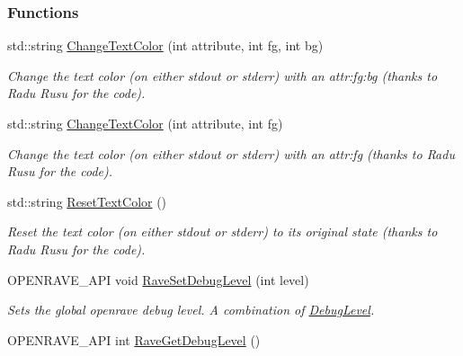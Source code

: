 \subsubsection*{Functions}
\begin{DoxyCompactItemize}
\item 
\hypertarget{namespaceOpenRAVE_a985876f10adcdcd967c0293b7ec17022}{
std::string \hyperlink{namespaceOpenRAVE_a985876f10adcdcd967c0293b7ec17022}{ChangeTextColor} (int attribute, int fg, int bg)}
\label{namespaceOpenRAVE_a985876f10adcdcd967c0293b7ec17022}

\begin{DoxyCompactList}\small\item\em Change the text color (on either stdout or stderr) with an attr:fg:bg (thanks to Radu Rusu for the code). \item\end{DoxyCompactList}\item 
\hypertarget{namespaceOpenRAVE_ab58a943ef75af625e8f87e6d2f6f7b3c}{
std::string \hyperlink{namespaceOpenRAVE_ab58a943ef75af625e8f87e6d2f6f7b3c}{ChangeTextColor} (int attribute, int fg)}
\label{namespaceOpenRAVE_ab58a943ef75af625e8f87e6d2f6f7b3c}

\begin{DoxyCompactList}\small\item\em Change the text color (on either stdout or stderr) with an attr:fg (thanks to Radu Rusu for the code). \item\end{DoxyCompactList}\item 
\hypertarget{namespaceOpenRAVE_a3a8c6e48e14f9c6fc744d8abc2856f73}{
std::string \hyperlink{namespaceOpenRAVE_a3a8c6e48e14f9c6fc744d8abc2856f73}{ResetTextColor} ()}
\label{namespaceOpenRAVE_a3a8c6e48e14f9c6fc744d8abc2856f73}

\begin{DoxyCompactList}\small\item\em Reset the text color (on either stdout or stderr) to its original state (thanks to Radu Rusu for the code). \item\end{DoxyCompactList}\item 
\hypertarget{namespaceOpenRAVE_a0363fa6f5ee772cd444bdd70607bd564}{
OPENRAVE\_\-API void \hyperlink{namespaceOpenRAVE_a0363fa6f5ee772cd444bdd70607bd564}{RaveSetDebugLevel} (int level)}
\label{namespaceOpenRAVE_a0363fa6f5ee772cd444bdd70607bd564}

\begin{DoxyCompactList}\small\item\em Sets the global openrave debug level. A combination of \hyperlink{namespaceOpenRAVE_ab658e6d84759440dbf3c890446075395}{DebugLevel}. \item\end{DoxyCompactList}\item 
\hypertarget{namespaceOpenRAVE_a1b830590d02eab9d6e9f08e420c42d36}{
OPENRAVE\_\-API int \hyperlink{namespaceOpenRAVE_a1b830590d02eab9d6e9f08e420c42d36}{RaveGetDebugLevel} ()}
\label{namespaceOpenRAVE_a1b830590d02eab9d6e9f08e420c42d36}


\end{DoxyCompactItemize}

